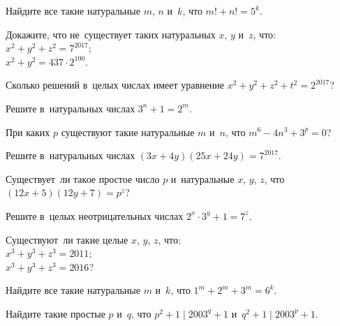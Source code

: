 


\begin{problems}

\item
Найдите все такие натуральные $m$, $n$ и~$k$, что $m! + n! = 5^{k}$.

\item
Докажите, что не~существует таких натуральных $x$, $y$ и~$z$, что:
\\
\subproblem $x^2 + y^2 + z^2 = 7^{2017}$;
\\
\subproblem $x^2 + y^2 = 437 \cdot 2^{100}$.

\item
Сколько решений в~целых числах имеет уравнение
$x^2 + y^2 + z^2 + t^2 = 2^{2017}$?

\item
Решите в~натуральных числах $3^{n} + 1 = 2^{m}$.

\item
При каких $p$ существуют такие натуральные $m$ и~$n$, что
$m^6 - 4 n^3 + 3^{p} = 0$? 

\item
Решите в~натуральных числах $(3 x + 4 y) (25 x + 24 y) = 7^{2017}$.

\item
Существует~ли такое простое число $p$ и~натуральные $x$, $y$, $z$, что
$(12 x + 5) (12 y + 7) = p^{z}$?

\item
Решите в~целых неотрицательных числах $2^{x} \cdot 3^{y} + 1 = 7^{z}$.

\item
Существуют~ли такие целые $x$, $y$, $z$, что:
\\
\subproblem $x^3 + y^3 + z^3 = 2011$;
\\
\subproblem $x^3 + y^3 + z^3 = 2016$?

\item
Найдите все такие натуральные $m$ и~$k$, что $1^{m} + 2^{m} + 3^{m} = 6^{k}$.

\item
Найдите такие простые $p$ и~$q$, что $p^2 + 1 \mid 2003^{q} + 1$
и~$q^2 + 1 \mid 2003^{p} + 1$.


\end{problems}

